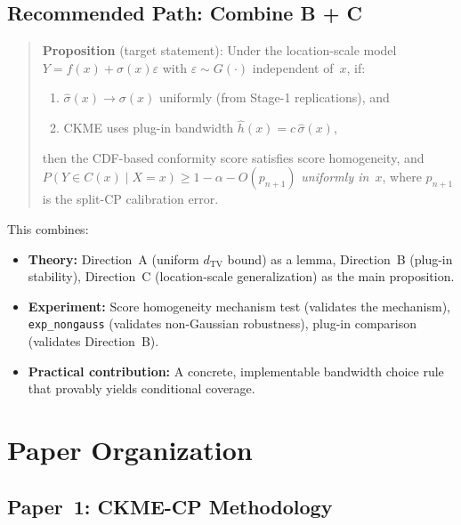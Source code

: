 \documentclass[11pt]{article}
\begin{document}
\subsection{Recommended Path: Combine B + C}

\begin{quote}
\textbf{Proposition} (target statement): Under the location-scale model
$Y = f(x) + \sigma(x)\varepsilon$ with $\varepsilon \sim G(\cdot)$
independent of~$x$, if:
\begin{enumerate}
  \item $\hat\sigma(x) \to \sigma(x)$ uniformly (from Stage-1
    replications), and
  \item CKME uses plug-in bandwidth $\hat h(x) = c\,\hat\sigma(x)$,
\end{enumerate}
then the CDF-based conformity score satisfies score homogeneity, and
$P(Y \in C(x) \mid X = x) \ge 1 - \alpha - O(p_{n+1})$
\emph{uniformly in~$x$}, where $p_{n+1}$ is the split-CP calibration
error.
\end{quote}

This combines:
\begin{itemize}
  \item \textbf{Theory:} Direction~A (uniform $d_{\mathrm{TV}}$ bound)
    as a lemma, Direction~B (plug-in stability), Direction~C
    (location-scale generalization) as the main proposition.
  \item \textbf{Experiment:} Score homogeneity mechanism test (validates
    the mechanism), \texttt{exp\_nongauss} (validates non-Gaussian
    robustness), plug-in comparison (validates Direction~B).
  \item \textbf{Practical contribution:} A concrete, implementable
    bandwidth choice rule that provably yields conditional coverage.
\end{itemize}


\section{Paper Organization}
\label{sec:paper-org}

\subsection{Paper~1: CKME-CP Methodology}
\end{document}
